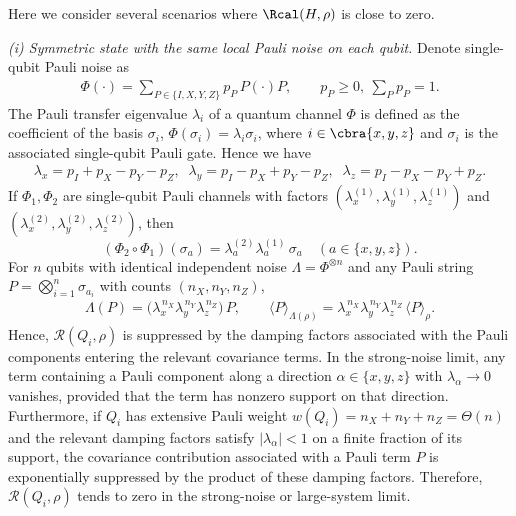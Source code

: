 \documentclass[prl,aps,notitlepage,superscriptaddress,showpacs,nofootinbib]{revtex4-2}
\begin{document}
Here we consider several scenarios where $\Rcal(H, \rho)$ is close to zero.

\emph{(i) Symmetric state with the same local Pauli noise on each qubit.} Denote single-qubit Pauli noise as
\begin{align}
\Phi (\cdot)= \sum_{P\in\{I,X,Y,Z\}} p_P\, P(\cdot )P,
\qquad p_P\ge 0,\ \sum_P p_P=1.
\end{align}
The Pauli transfer eigenvalue $\lambda_i$ of a quantum channel $\Phi$ is defined as the coefficient of the basis $\sigma_i$, $\Phi(\sigma_i) = \lambda_i \sigma_i$, where $i\in\cbra{x,y,z}$ and $\sigma_i$ is the associated single-qubit Pauli gate. Hence we have
\begin{align}
    \lambda_x=p_I+p_X-p_Y-p_Z,\;\;
\lambda_y=p_I-p_X+p_Y-p_Z,\;\;
\lambda_z=p_I-p_X-p_Y+p_Z.
\end{align}
If $\Phi_1,\Phi_2$ are single-qubit Pauli channels with factors $(\lambda_x^{(1)},\lambda_y^{(1)},\lambda_z^{(1)})$ and
$(\lambda_x^{(2)},\lambda_y^{(2)},\lambda_z^{(2)})$, then
\[
(\Phi_2\circ \Phi_1)(\sigma_a)=\lambda_a^{(2)}\lambda_a^{(1)}\,\sigma_a
\quad(a\in\{x,y,z\}).
\]
For $n$ qubits with identical independent noise $\Lambda=\Phi^{\otimes n}$ and any Pauli string
$P=\bigotimes_{i=1}^n \sigma_{a_i}$ with counts $(n_X,n_Y,n_Z)$, 
\begin{align}
\Lambda(P)=\Big(\lambda_x^{\,n_X}\lambda_y^{\,n_Y}\lambda_z^{\,n_Z}\Big)\,P,
\qquad
\langle P\rangle_{\Lambda(\rho)}=\lambda_x^{\,n_X}\lambda_y^{\,n_Y}\lambda_z^{\,n_Z}\,\langle P\rangle_\rho.
\end{align}
Hence, $\mathcal{R}(Q_i,\rho)$ is suppressed by the damping factors associated with the Pauli components entering the relevant covariance terms. In the strong-noise limit, any term containing a Pauli component along a direction $\alpha\in\{x,y,z\}$ with $\lambda_\alpha\to 0$ vanishes, provided that the term has nonzero support on that direction. 
Furthermore, if $Q_i$ has extensive Pauli weight $w(Q_i)=n_X+n_Y+n_Z=\Theta(n)$ and the relevant damping factors satisfy $|\lambda_\alpha|<1$ on a finite fraction of its support, the covariance contribution associated with a Pauli term $P$ is exponentially suppressed by the product of these damping factors. Therefore, $\mathcal{R}(Q_i,\rho)$ tends to zero in the strong-noise or large-system limit.
\end{document}
